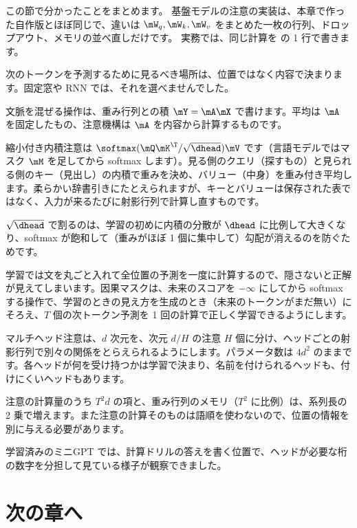 この節で分かったことをまとめます。
基盤モデルの注意の実装は、本章で作った自作版とほぼ同じで、違いは $\mW_q,\mW_k,\mW_v$ をまとめた一枚の行列、ドロップアウト、メモリの並べ直しだけです。
実務では、同じ計算を  の 1 行で書きます。

\begin{summary}
\item 次のトークンを予測するために見るべき場所は、位置ではなく内容で決まります。固定窓や RNN では、それを選べませんでした。
\item 文脈を混ぜる操作は、重み行列との積 $\mY=\mA\mX$ で書けます。平均は $\mA$ を固定したもの、注意機構は $\mA$ を内容から計算するものです。
\item 縮小付き内積注意は $\softmax(\mQ\mK^\T/\sqrt{\dhead})\mV$ です（言語モデルではマスク $\mM$ を足してから softmax します）。見る側のクエリ（探すもの）と見られる側のキー（見出し）の内積で重みを決め、バリュー（中身）を重み付き平均します。柔らかい辞書引きにたとえられますが、キーとバリューは保存された表ではなく、入力が来るたびに射影行列で計算し直すものです。
\item $\sqrt{\dhead}$ で割るのは、学習の初めに内積の分散が $\dhead$ に比例して大きくなり、softmax が飽和して（重みがほぼ 1 個に集中して）勾配が消えるのを防ぐためです。
\item 学習では文を丸ごと入れて全位置の予測を一度に計算するので、隠さないと正解が見えてしまいます。因果マスクは、未来のスコアを $-\infty$ にしてから softmax する操作で、学習のときの見え方を生成のとき（未来のトークンがまだ無い）にそろえ、$T$ 個の次トークン予測を 1 回の計算で正しく学習できるようにします。
\item マルチヘッド注意は、$d$ 次元を、次元 $d/H$ の注意 $H$ 個に分け、ヘッドごとの射影行列で別々の関係をとらえられるようにします。パラメータ数は $4d^2$ のままです。各ヘッドが何を受け持つかは学習で決まり、名前を付けられるヘッドも、付けにくいヘッドもあります。
\item 注意の計算量のうち $T^2d$ の項と、重み行列のメモリ（$T^2$ に比例）は、系列長の 2 乗で増えます。また注意の計算そのものは語順を使わないので、位置の情報を別に与える必要があります。
\item 学習済みのミニGPT では、計算ドリルの答えを書く位置で、ヘッドが必要な桁の数字を分担して見ている様子が観察できました。
\end{summary}

\section*{次の章へ}

